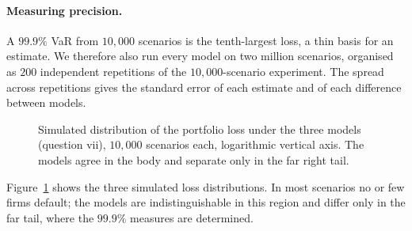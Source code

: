 \paragraph{Measuring precision.}
A $99.9\%$ VaR from $10{,}000$ scenarios is the tenth-largest loss, a thin basis for an estimate. We therefore also run every model on two million scenarios, organised as $200$ independent repetitions of the $10{,}000$-scenario experiment. The spread across repetitions gives the standard error of each estimate and of each difference between models.

\begin{figure}[tb]
\centering
{}
\caption{Simulated distribution of the portfolio loss under the three models (question vii), $10{,}000$ scenarios each, logarithmic vertical axis. The models agree in the body and separate only in the far right tail.}
\label{fig:hist}
\end{figure}

Figure~\ref{fig:hist} shows the three simulated loss distributions. In most scenarios no or few firms default; the models are indistinguishable in this region and differ only in the far tail, where the $99.9\%$ measures are determined.

